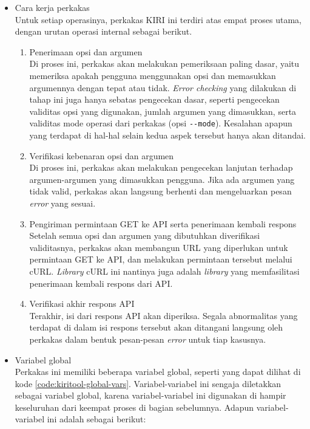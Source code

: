 \begin{itemize}[listparindent=\parindent]
	\item Cara kerja perkakas \\
	Untuk setiap operasinya, perkakas \cl KIRI ini terdiri atas empat proses utama, dengan urutan operasi internal sebagai berikut.
	
	\begin{enumerate}
		\item Penerimaan opsi dan argumen \\
		Di proses ini, perkakas akan melakukan pemeriksaan paling dasar, yaitu memeriksa apakah pengguna menggunakan opsi dan memasukkan argumennya dengan tepat atau tidak. \textit{Error checking} yang dilakukan di tahap ini juga hanya sebatas pengecekan dasar, seperti pengecekan validitas opsi yang digunakan, jumlah argumen yang dimasukkan, serta validitas mode operasi dari perkakas (opsi \verb|--mode|). Kesalahan apapun yang terdapat di hal-hal selain kedua aspek tersebut hanya akan ditandai.
		\item Verifikasi kebenaran opsi dan argumen \\
		Di proses ini, perkakas akan melakukan pengecekan lanjutan terhadap argumen-argumen yang dimasukkan pengguna. Jika ada argumen yang tidak valid, perkakas akan langsung berhenti dan mengeluarkan pesan \textit{error} yang sesuai.
		\item Pengiriman permintaan GET ke API serta penerimaan kembali respons\\
		Setelah semua opsi dan argumen yang dibutuhkan diverifikasi validitasnya, perkakas akan membangun URL yang diperlukan untuk permintaan GET ke API, dan melakukan permintaan tersebut melalui cURL. \textit{Library} cURL ini nantinya juga adalah \textit{library} yang memfasilitasi penerimaan kembali respons dari API.
		\item Verifikasi akhir respons API \\
		Terakhir, isi dari respons API akan diperiksa. Segala abnormalitas yang terdapat di dalam isi respons tersebut akan ditangani langsung oleh perkakas dalam bentuk pesan-pesan \textit{error} untuk tiap kasusnya.
	\end{enumerate}
	
	\item Variabel global \\
	Perkakas ini memiliki beberapa variabel global, seperti yang dapat dilihat di kode \ref{code:kiritool-global-vars}. Variabel-variabel ini sengaja diletakkan sebagai variabel global, karena variabel-variabel ini digunakan di hampir keseluruhan dari keempat proses di bagian sebelumnya. Adapun variabel-variabel ini adalah sebagai berikut:
	

\end{itemize}
